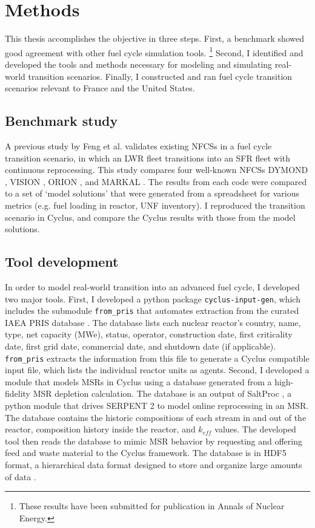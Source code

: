 \section{Methods}
This thesis accomplishes the objective in three steps. 
First, a benchmark showed good agreement with other
fuel cycle simulation tools. \footnote{These results have been
submitted for publication in Annals of Nuclear Energy.}
Second, I identified and developed the tools and methods necessary
for modeling and simulating real-world transition scenarios.
Finally, I constructed and ran fuel cycle transition scenarios
relevant to France and the United States.

\subsection{Benchmark study}
A previous study by Feng et al. \cite{feng_standardized_2016} validates existing 
\glspl{NFCS} in a fuel cycle transition scenario, in which an \gls{LWR} fleet
transitions into an \gls{SFR} fleet with continuous reprocessing. This 
study compares four well-known \glspl{NFCS}
DYMOND \cite{yacout_modeling_2005},
VISION \cite{jacobson_verifiable_2010},
ORION \cite{gregg_analysis_2012}, and
MARKAL \cite{shay_epa_2006}. The results from each code were
compared to a set of `model solutions' that were generated
from a spreadsheet for various metrics (e.g. fuel loading
in reactor, \gls{UNF} inventory). I reproduced the transition
scenario in Cyclus, and compare the Cyclus results with those
from the model solutions.

\subsection{Tool development}
In order to model real-world transition into an advanced
fuel cycle, I developed two major tools. First, I developed a python package \texttt{cyclus-input-gen},
which includes the submodule \texttt{from\_pris}
that automates extraction from the curated \gls{IAEA} \gls{PRIS} database
\cite{iaea_nuclear_2018}. The database lists each nuclear reactor's
country, name, type, net capacity (\gls{MWe}), status, operator, construction
date, first criticality date, first grid date, commercial date, and shutdown
date (if applicable). \texttt{from\_pris} extracts the information from this file
to generate a Cyclus compatible input file, which lists the individual
reactor units as agents. Second, I developed a module that models \glspl{MSR}
in Cyclus using a database generated from a high-fidelity \gls{MSR} depletion calculation.
The database is an output of SaltProc \cite{rykhlevskii_arfc/saltproc:_2018}, a python
module that drives
SERPENT 2 \cite{leppanen_serpentcontinuous-energy_2013} to model online reprocessing in an \gls{MSR}.
The database contains the historic compositions of each stream in and out of the reactor,
composition history inside the reactor, and $k_{eff}$ values. The developed tool then
reads the database to mimic \gls{MSR} behavior by requesting and offering
feed and waste material to the Cyclus framework. The database is in HDF5
format, a hierarchical data format designed to store and organize
large amounts of data \cite{the_hdf_group_hierarchical_1997}.

